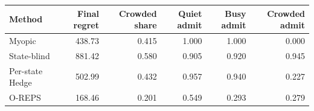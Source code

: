 \begin{tabular}{lrrrrr}
\toprule
Method & Final regret & Crowded share & Quiet admit & Busy admit & Crowded admit \\
\midrule
Myopic & 438.73 & 0.415 & 1.000 & 1.000 & 0.000 \\
State-blind & 881.42 & 0.580 & 0.905 & 0.920 & 0.945 \\
Per-state Hedge & 502.99 & 0.432 & 0.957 & 0.940 & 0.227 \\
O-REPS & 168.46 & 0.201 & 0.549 & 0.293 & 0.279 \\
\bottomrule
\end{tabular}
